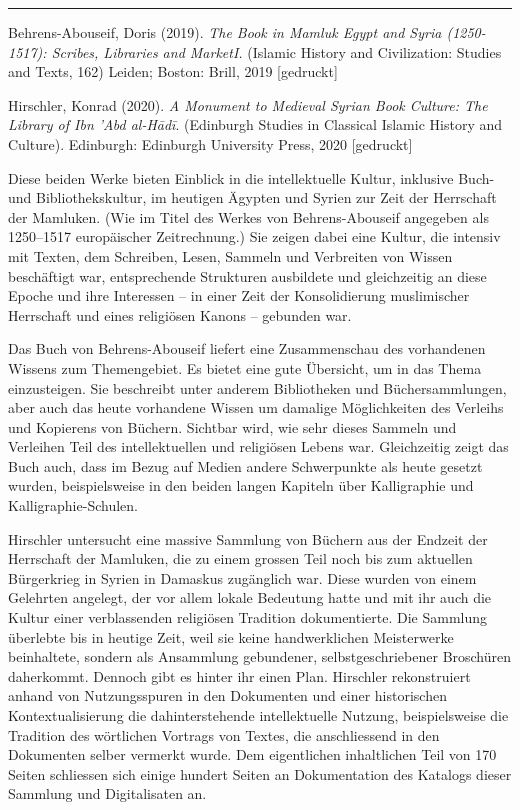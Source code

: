\documentclass[a4paper,
fontsize=11pt,
oneside,
numbers=noperiodatend,
parskip=half-,
bibliography=totoc,
final
]{scrartcl}
\begin{document}
\begin{center}\rule{0.5\linewidth}{0.5pt}\end{center}

Behrens-Abouseif, Doris (2019). \emph{The Book in Mamluk Egypt and Syria
(1250-1517): Scribes, Libraries and MarketI.} (Islamic History and
Civilization: Studies and Texts, 162) Leiden; Boston: Brill, 2019
{[}gedruckt{]}

Hirschler, Konrad (2020). \emph{A Monument to Medieval Syrian Book
Culture: The Library of Ibn 'Abd al-Hādī}. (Edinburgh Studies in
Classical Islamic History and Culture). Edinburgh: Edinburgh University
Press, 2020 {[}gedruckt{]}

Diese beiden Werke bieten Einblick in die intellektuelle Kultur,
inklusive Buch- und Bibliothekskultur, im heutigen Ägypten und Syrien
zur Zeit der Herrschaft der Mamluken. (Wie im Titel des Werkes von
Behrens-Abouseif angegeben als 1250--1517 europäischer Zeitrechnung.)
Sie zeigen dabei eine Kultur, die intensiv mit Texten, dem Schreiben,
Lesen, Sammeln und Verbreiten von Wissen beschäftigt war, entsprechende
Strukturen ausbildete und gleichzeitig an diese Epoche und ihre
Interessen -- in einer Zeit der Konsolidierung muslimischer Herrschaft
und eines religiösen Kanons -- gebunden war.

Das Buch von Behrens-Abouseif liefert eine Zusammenschau des vorhandenen
Wissens zum Themengebiet. Es bietet eine gute Übersicht, um in das Thema
einzusteigen. Sie beschreibt unter anderem Bibliotheken und
Büchersammlungen, aber auch das heute vorhandene Wissen um damalige
Möglichkeiten des Verleihs und Kopierens von Büchern. Sichtbar wird, wie
sehr dieses Sammeln und Verleihen Teil des intellektuellen und
religiösen Lebens war. Gleichzeitig zeigt das Buch auch, dass im Bezug
auf Medien andere Schwerpunkte als heute gesetzt wurden, beispielsweise
in den beiden langen Kapiteln über Kalligraphie und
Kalligraphie-Schulen.

Hirschler untersucht eine massive Sammlung von Büchern aus der Endzeit
der Herrschaft der Mamluken, die zu einem grossen Teil noch bis zum
aktuellen Bürgerkrieg in Syrien in Damaskus zugänglich war. Diese wurden
von einem Gelehrten angelegt, der vor allem lokale Bedeutung hatte und
mit ihr auch die Kultur einer verblassenden religiösen Tradition
dokumentierte. Die Sammlung überlebte bis in heutige Zeit, weil sie
keine handwerklichen Meisterwerke beinhaltete, sondern als Ansammlung
gebundener, selbstgeschriebener Broschüren daherkommt. Dennoch gibt es
hinter ihr einen Plan. Hirschler rekonstruiert anhand von Nutzungsspuren
in den Dokumenten und einer historischen Kontextualisierung die
dahinterstehende intellektuelle Nutzung, beispielsweise die Tradition
des wörtlichen Vortrags von Textes, die anschliessend in den Dokumenten
selber vermerkt wurde. Dem eigentlichen inhaltlichen Teil von 170 Seiten
schliessen sich einige hundert Seiten an Dokumentation des Katalogs
dieser Sammlung und Digitalisaten an.
\end{document}
